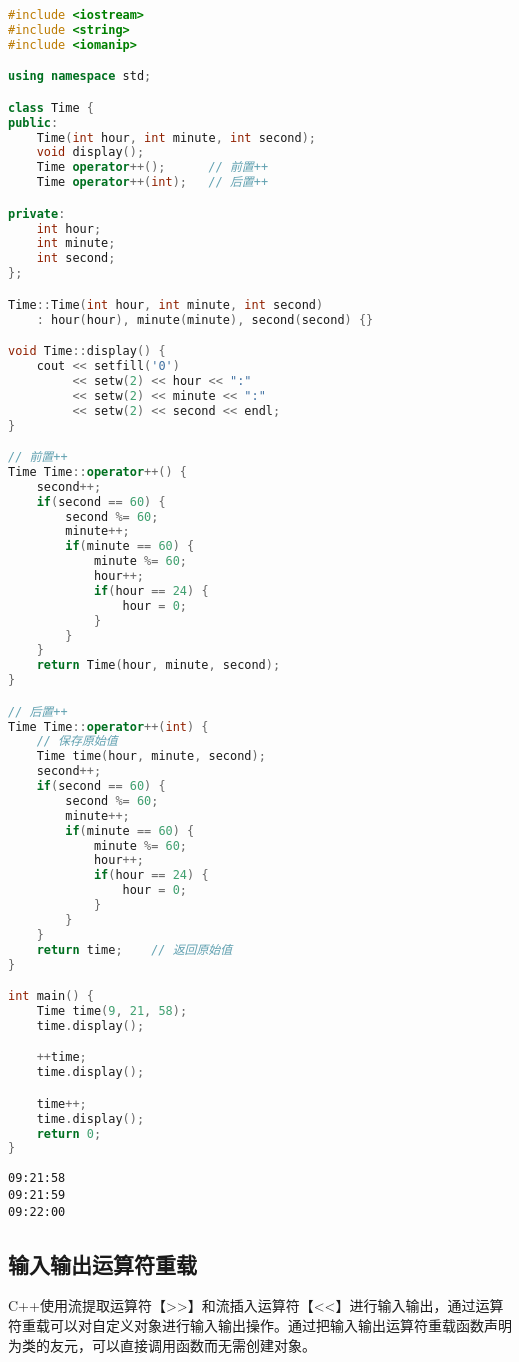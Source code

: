 \begin{lstlisting}[language=C++]
#include <iostream>
#include <string>
#include <iomanip>

using namespace std;

class Time {
public:
    Time(int hour, int minute, int second);
    void display();
    Time operator++();      // 前置++
    Time operator++(int);   // 后置++

private:
    int hour;
    int minute;
    int second;
};

Time::Time(int hour, int minute, int second) 
    : hour(hour), minute(minute), second(second) {}

void Time::display() {
    cout << setfill('0')
         << setw(2) << hour << ":"
         << setw(2) << minute << ":"
         << setw(2) << second << endl;
}

// 前置++
Time Time::operator++() {
    second++;
    if(second == 60) {
        second %= 60;
        minute++;
        if(minute == 60) {
            minute %= 60;
            hour++;
            if(hour == 24) {
                hour = 0;
            }
        }
    }
    return Time(hour, minute, second);
}

// 后置++
Time Time::operator++(int) {
    // 保存原始值
    Time time(hour, minute, second);
    second++;
    if(second == 60) {
        second %= 60;
        minute++;
        if(minute == 60) {
            minute %= 60;
            hour++;
            if(hour == 24) {
                hour = 0;
            }
        }
    }
    return time;    // 返回原始值
}

int main() {
    Time time(9, 21, 58);
    time.display();

    ++time;
    time.display();

    time++;
    time.display();
    return 0;
}
\end{lstlisting}

\begin{tcolorbox}
	\begin{verbatim}
09:21:58
09:21:59
09:22:00
	\end{verbatim}
\end{tcolorbox}

\vspace{0.5cm}

\subsection{输入输出运算符重载}

C++使用流提取运算符【>>】和流插入运算符【<<】进行输入输出，通过运算符重载可以对自定义对象进行输入输出操作。通过把输入输出运算符重载函数声明为类的友元，可以直接调用函数而无需创建对象。\\


